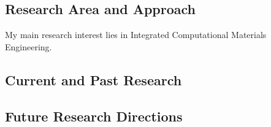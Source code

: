 \documentclass[
  a4paper, 
]{fortysecondscv}
\begin{document}
\makefrontsidebar

\subsection{Research Area and Approach}
My main research interest lies in Integrated Computational Materials Engineering.
\subsection{Current and Past Research}
\lipsum[2]
\subsection{Future Research Directions}
\lipsum[3]
\end{document}
